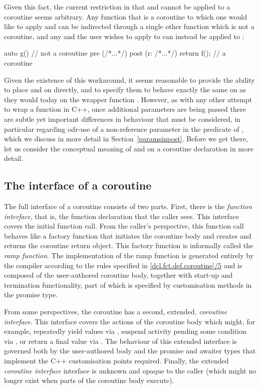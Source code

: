 Given this fact, the current restriction in \cite{P2900R8} that  and  cannot be applied to a coroutine seems arbitrary. Any function  that is a coroutine to which one would like to apply  and  can be indirected through a single other function  which is not a coroutine, and any  and  the user wishes to apply to  can instead be applied to :
\begin{codeblock}
auto g()  // not a coroutine
  pre (/*...*/) 
  post (r: /*...*/) 
{ 
  return f();  // a coroutine
} 
\end{codeblock}
Given the existence of this workaround, it seems reasonable to provide the ability to place  and  on  directly, and to specify them to behave exactly the same on  as they would today on the wrapper function . However, as with any other attempt to wrap a function in C++, once additional parameters are being passed there are subtle yet important differences in behaviour that must be considered, in particular regarding odr-use of a non-reference parameter in the predicate of , which we discuss in more detail in Section~\ref{paramsinpost}. Before we get there, let us consider the conceptual meaning of  and  on a coroutine declaration in more detail.

\subsection{The interface of a coroutine}

The full interface of a coroutine consists of two parts. First, there is the \emph{function interface}, that is, the function declaration that the caller sees. This interface covers the initial function call. From the caller's perspective, this function call behaves like a factory function that initiates the coroutine body and creates and returns the coroutine return object. This factory function is informally called the \emph{ramp function}. The implementation of the ramp function is generated entirely by the compiler according to the rules specified in \href{https://eel.is/c++draft/dcl.fct.def.coroutine#5}{[dcl.fct.def.coroutine]/5} and is composed of the user-authored coroutine body, together with start-up and termination functionality, part of which is specified by customisation methods in the promise type.

From some perspectives, the coroutine has a second, extended, \emph{coroutine interface}. This interface covers the actions of the coroutine body which might, for example, repeatedly yield values via , suspend activity pending some condition via , or return a final value via .  The behaviour of this extended interface is governed both by the user-authored body and the promise and awaiter types that implement the C++ customisation points required.  Finally, the extended \emph{coroutine interface} interface is unknown and opaque to the caller (which might no longer exist when parts of the coroutine body execute).

